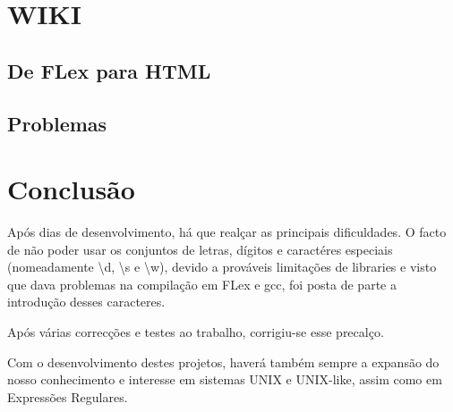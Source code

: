 \documentclass[11pt,a4paper]{report}
\begin{document}
\raggedbottom
\pagebreak

\chapter{WIKI}
\section{De FLex para HTML}

\pagebreak
\section{Problemas}




\chapter{Conclusão}

Após dias de desenvolvimento, há que realçar as principais dificuldades. O facto de não poder usar os conjuntos de letras, dígitos e caractéres especiais (nomeadamente \textbackslash d, \textbackslash s e \textbackslash w), devido a prováveis limitações de libraries e visto que dava problemas na compilação em FLex e gcc, foi posta de parte a introdução desses caracteres.

Após várias correcções e testes ao trabalho, corrigiu-se esse precalço.

Com o desenvolvimento destes projetos, haverá também sempre a expansão do nosso conhecimento e interesse em sistemas UNIX e UNIX-like, assim como em Expressões Regulares.
\end{document}
